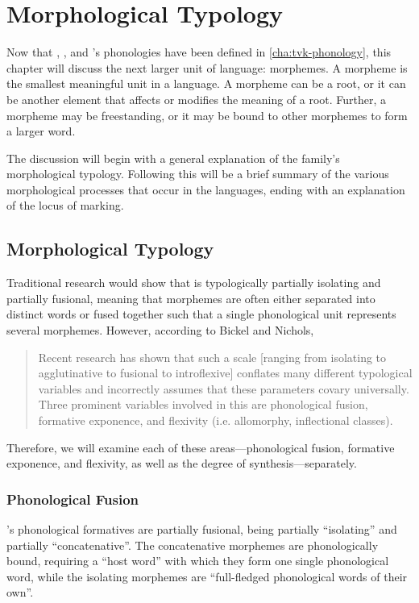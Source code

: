 \chapter{Morphological Typology}
\label{cha:tvk-morphological-typology}

Now that \langtvk, \langank, and \langrdk's phonologies have been defined in \autoref{cha:tvk-phonology}, this chapter will discuss the next larger unit of language: morphemes. A morpheme is the smallest meaningful unit in a language. A morpheme can be a root, or it can be another element that affects or modifies the meaning of a root. Further, a morpheme may be freestanding, or it may be bound to other morphemes to form a larger word.

The discussion will begin with a general explanation of the \langtvk{} family's morphological typology. Following this will be a brief summary of the various morphological processes that occur in the languages, ending with an explanation of the locus of marking.

\section{Morphological Typology}
\label{sec:tvk-typology}

Traditional research would show that \langtvk{} is typologically partially isolating and partially fusional, meaning that morphemes are often either separated into distinct words or fused together such that a single phonological unit represents several morphemes. However, according to Bickel and Nichols, \blockquote{Recent research has shown that such a scale [ranging from isolating to agglutinative to fusional to introflexive] conflates many different typological variables and incorrectly assumes that these parameters covary universally\autocite{Plank-1999,Bickel-and-Nichols-2005}. Three prominent variables involved in this are phonological fusion, formative exponence, and flexivity (i.e. allomorphy, inflectional classes).\autocite{wals-20}} Therefore, we will examine each of these areas---phonological fusion, formative exponence, and flexivity, as well as the degree of synthesis---separately.

\subsection{Phonological Fusion}
\label{subsec:tvk-fusion}

\langtvk's phonological formatives are partially fusional, being partially \enquote{isolating} and partially \enquote{concatenative}\autocite{wals-20}. The concatenative morphemes are phonologically bound, requiring a \enquote{host word} with which they form one single phonological word, while the isolating morphemes are \enquote{full-fledged phonological words of their own}.

